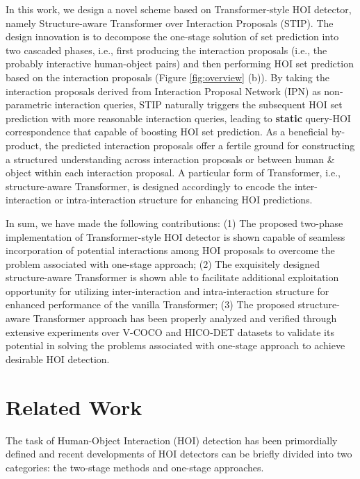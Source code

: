 \documentclass[10pt,twocolumn,letterpaper]{article}
\begin{document}
In this work, we design a novel scheme based on Transformer-style HOI detector, namely Structure-aware Transformer over Interaction Proposals (STIP). The design innovation is to decompose the one-stage solution of set prediction into two cascaded phases, i.e., first producing the interaction proposals (i.e., the probably interactive human-object pairs) and then performing HOI set prediction based on the interaction proposals (Figure \ref{fig:overview} (b)). By taking the interaction proposals derived from Interaction Proposal Network (IPN) as non-parametric interaction queries, STIP naturally triggers the subsequent HOI set prediction with more reasonable interaction queries, leading to \textbf{static} query-HOI correspondence that capable of boosting HOI set prediction. As a beneficial by-product, the predicted interaction proposals offer a fertile ground for constructing a structured understanding across interaction proposals or between human \& object within each interaction proposal. A particular form of Transformer, i.e., structure-aware Transformer, is designed accordingly to encode the inter-interaction or intra-interaction structure for enhancing HOI predictions.

In sum, we have made the following contributions: (1) The proposed two-phase implementation of Transformer-style HOI detector is shown capable of seamless incorporation of potential interactions among HOI proposals to overcome the problem associated with one-stage approach; (2) The exquisitely designed structure-aware Transformer is shown able to facilitate additional exploitation opportunity for utilizing inter-interaction and intra-interaction structure for enhanced performance of the vanilla Transformer; (3) The proposed structure-aware Transformer approach has been properly analyzed and verified through extensive experiments over V-COCO and HICO-DET datasets to validate its potential in solving the problems associated with one-stage approach to achieve desirable HOI detection.

\section{Related Work}

The task of Human-Object Interaction (HOI) detection has been primordially defined \cite{chao2015hico,gupta2015visual} and recent developments of HOI detectors can be briefly divided into two categories: the two-stage methods and one-stage approaches.
\end{document}
